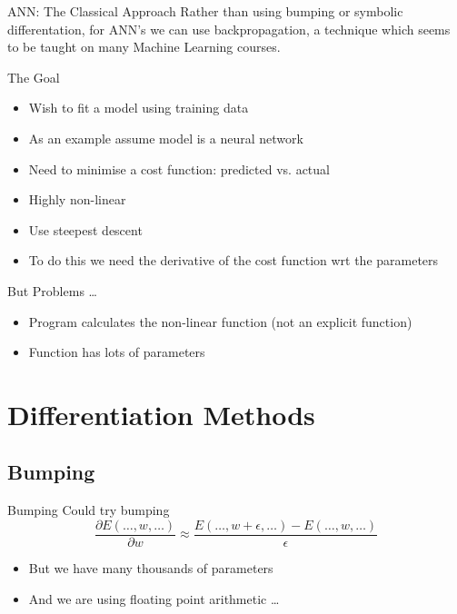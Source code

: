 \documentclass{beamer}
\begin{document}
\begin{frame}[fragile]{ANN: The Classical Approach}
Rather than using bumping or symbolic differentation, for ANN's we can
use backpropagation, a technique which seems to be taught on many
Machine Learning courses.
\end{frame}

\begin{frame}{The Goal}

  \begin{itemize}
  \item Wish to fit a model using training data
  \item As an example assume model is a neural network
  \item Need to minimise a cost function: predicted vs. actual
  \item Highly non-linear
  \item Use steepest descent
  \item To do this we need the derivative of the cost function wrt the
    parameters
\end{itemize}

\end{frame}

\begin{frame}{But Problems \ldots}
\begin{itemize}
\item
Program calculates the non-linear function (not an explicit function)
\item
Function has lots of parameters
\end{itemize}
\end{frame}

\section{Differentiation Methods}

\subsection{Bumping}

\begin{frame}{Bumping}
Could try bumping
$$
\frac{\partial E(\ldots, w, \ldots)}{\partial w} \approx \frac{E(\ldots, w + \epsilon, \ldots) - E(\ldots, w, \ldots)}{\epsilon}
$$
\begin{itemize}
\item
But we have many thousands of parameters
\item
And we are using floating point arithmetic \ldots
\end{itemize}
\end{frame}
\end{document}
